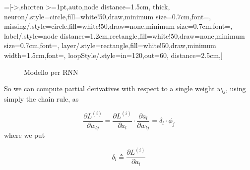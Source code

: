 \documentclass{article}
\begin{document}
=[->,shorten >=1pt,auto,node distance=1.5cm,
  thick,
  neuron/.style={circle,fill=white!50,draw,minimum size=0.7cm,font=\sffamily\Large\bfseries},
  missing/.style={circle,fill=white!50,draw=none,minimum size=0.7cm,font=\sffamily\Huge\bfseries},
  label/.style={node distance=1.2cm,rectangle,fill=white!50,draw=none,minimum size=0.7cm,font=\sffamily\normalsize},
  layer/.style={rectangle,fill=white!50,draw,minimum width=1.5cm,font=\sffamily\normalsize},
  loopStyle/.style={in=120,out=60, distance=2.5cm},]
\begin{figure}[h!]
 \centering
{}
\caption{Modello per RNN}
\label{rnn_model}
\end{figure}

So we can compute partial derivatives with respect to a single weight $w_{lj}$, using simply the chain rule, as 

$$\frac{\partial L^{(i)}}{\partial w_{lj}}=\frac{\partial L^{(i)}}{\partial a_l} \cdot \frac{\partial a_l}{\partial w_{lj}}=\delta_l \cdot \phi_j$$
where we put

\begin{equation}
\delta_l \triangleq \frac{\partial L^{(i)}}{\partial a_l}
\end{equation}
\end{document}
